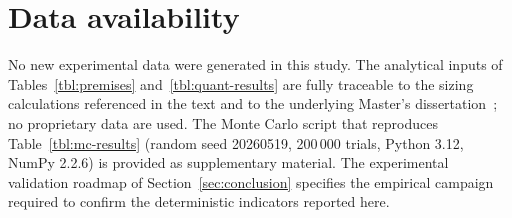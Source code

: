 \documentclass[a4paper,fleqn]{cas-dc}
\begin{document}
\section*{Data availability}
No new experimental data were generated in this study. The analytical
inputs of Tables~\ref{tbl:premises} and~\ref{tbl:quant-results} are
fully traceable to the sizing calculations referenced in the text and
to the underlying Master's dissertation~\citep{porto2026dissertation};
no proprietary data are used. The Monte Carlo script that reproduces
Table~\ref{tbl:mc-results} (random seed 20260519, 200\,000 trials,
Python 3.12, NumPy 2.2.6) is provided as supplementary material. The
experimental validation roadmap of Section~\ref{sec:conclusion}
specifies the empirical campaign required to confirm the deterministic
indicators reported here.




\end{document}
